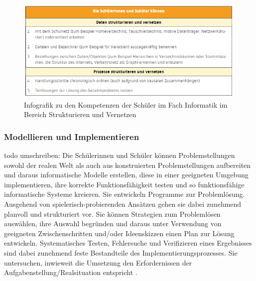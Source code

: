 \begin{figure}[H]
	\centering
	\includegraphics[width=\textwidth,height=\textheight,keepaspectratio]{images/struc.png}
	\caption{Infografik zu den Kompetenzen der Schüler im Fach Informatik im Bereich Strukturieren und Vernetzen}
	\label{Strukturieren und Vernetzen Infografik}
\end{figure}

\subsubsection{Modellieren und Implementieren}

todo umschreiben:
Die Schülerinnen und Schüler können Problemstellungen sowohl der realen Welt als auch aus konstruierten Problemstellungen aufbereiten und daraus informatische Modelle erstellen, diese in einer geeigneten Umgebung implementieren, ihre korrekte Funktionsfähigkeit testen und so funktionsfähige informatische Systeme kreieren.
Sie entwickeln Programme zur Problemlösung. Ausgehend von spielerisch-probierenden Ansätzen gehen sie dabei zunehmend planvoll und strukturiert vor. Sie können Strategien zum Problemlösen auswählen, ihre Auswahl begründen und daraus unter Verwendung von geeigneten Zwischenschritten und/oder Ideenskizzen einen Plan zur Lösung entwickeln. Systematisches Testen, Fehlersuche und Verifizieren eines Ergebnisses sind dabei zunehmend feste Bestandteile des Implementierungsprozesses. Sie untersuchen, inwieweit die Umsetzung den Erfordernissen der Aufgabenstellung/Realsituation entspricht \cite{Model}.

